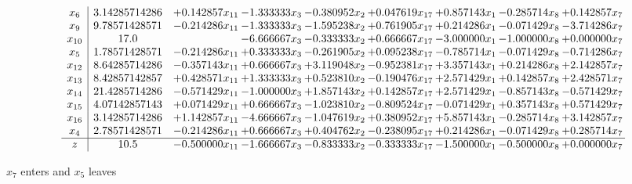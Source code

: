 \documentclass[10pt]{article}
\begin{document}
 \[\begin{array}{c| c c@{\hskip 2pt} c@{\hskip 2pt} c@{\hskip 2pt} c@{\hskip 2pt} c@{\hskip 2pt} c@{\hskip 2pt} c@{\hskip 2pt} }
 x_{6}   &  3.14285714286 & + 0.142857 x_{11} & -1.333333 x_{3} & -0.380952 x_{2} & + 0.047619 x_{17} & + 0.857143 x_{1} & -0.285714 x_{8} & + 0.142857 x_{7}\\
 x_{9}   &  9.78571428571 & -0.214286 x_{11} & -1.333333 x_{3} & -1.595238 x_{2} & + 0.761905 x_{17} & + 0.214286 x_{1} & -0.071429 x_{8} & -3.714286 x_{7}\\
 x_{10}   &  17.0  &   & -6.666667 x_{3} & -0.333333 x_{2} & + 0.666667 x_{17} & -3.000000 x_{1} & -1.000000 x_{8} & + 0.000000 x_{7}\\
 x_{5}   &  1.78571428571 & -0.214286 x_{11} & + 0.333333 x_{3} & -0.261905 x_{2} & + 0.095238 x_{17} & -0.785714 x_{1} & -0.071429 x_{8} & -0.714286 x_{7}\\
 x_{12}   &  8.64285714286 & -0.357143 x_{11} & + 0.666667 x_{3} & + 3.119048 x_{2} & -0.952381 x_{17} & + 3.357143 x_{1} & + 0.214286 x_{8} & + 2.142857 x_{7}\\
 x_{13}   &  8.42857142857 & + 0.428571 x_{11} & + 1.333333 x_{3} & + 0.523810 x_{2} & -0.190476 x_{17} & + 2.571429 x_{1} & + 0.142857 x_{8} & + 2.428571 x_{7}\\
 x_{14}   &  21.4285714286 & -0.571429 x_{11} & -1.000000 x_{3} & + 1.857143 x_{2} & + 0.142857 x_{17} & + 2.571429 x_{1} & -0.857143 x_{8} & -0.571429 x_{7}\\
 x_{15}   &  4.07142857143 & + 0.071429 x_{11} & + 0.666667 x_{3} & -1.023810 x_{2} & -0.809524 x_{17} & -0.071429 x_{1} & + 0.357143 x_{8} & + 0.571429 x_{7}\\
 x_{16}   &  3.14285714286 & + 1.142857 x_{11} & -4.666667 x_{3} & -1.047619 x_{2} & + 0.380952 x_{17} & + 5.857143 x_{1} & -0.285714 x_{8} & + 3.142857 x_{7}\\
 x_{4}   &  2.78571428571 & -0.214286 x_{11} & + 0.666667 x_{3} & + 0.404762 x_{2} & -0.238095 x_{17} & + 0.214286 x_{1} & -0.071429 x_{8} & + 0.285714 x_{7}\\
\hline
z    &  10.5 & -0.500000 x_{11} & -1.666667 x_{3} & -0.833333 x_{2} & -0.333333 x_{17} & -1.500000 x_{1} & -0.500000 x_{8} & + 0.000000 x_{7}\\
\end{array}\]


 $ x_{7} $ enters and $ x_{5} $ leaves 
\end{document}
